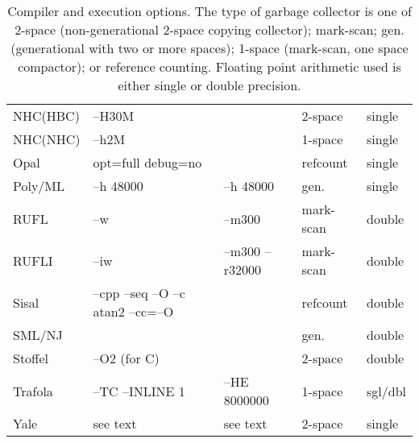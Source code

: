 \begin{table}
\begin{minipage}{\hsize}
\begin{center}
\begin{tabular}{|l|l|l|l|l|}
NHC(HBC)     & --H30M          &                             & 2-space  & single \\
NHC(NHC)     & --h2M           &                             & 1-space  & single \\
Opal         & opt=full debug=no  &                          & refcount & single \\
Poly/ML      & --h 48000       & --h 48000                   & gen.     & single \\
RUFL         & --w             & --m300                      & mark-scan& double \\
RUFLI        & --iw            & --m300 --r32000             & mark-scan& double \\
Sisal        & --cpp --seq --O --c atan2 --cc=--O &          & refcount & double \\
SML/NJ       &                 &                             & gen.     & double \\
Stoffel      & --O2 (for C)    &                             & 2-space  & double \\
Trafola      & --TC --INLINE 1 & --HE 8000000                & 1-space  & sgl/dbl\\
Yale         & see text        & see text                    & 2-space  & single \\
\hline
\end{tabular}
\end{center}
\end{minipage}
\caption{Compiler and execution options. The type of garbage collector
is one of 2-space (non-generational 2-space copying collector); mark-scan; gen.
(generational with two or more spaces); 1-space (mark-scan, one space
compactor); or reference counting. Floating point arithmetic used is
either single or double precision.}
\label{tbl:option}
\end{table}

